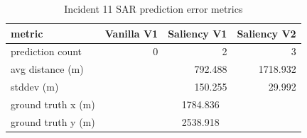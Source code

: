 \begin{table}[ht]
\centering
\caption{Incident 11 SAR prediction error metrics}
\label{tab:sar-incident-11}
\begin{tabular}{lrrr}
\hline
metric & Vanilla V1 & Saliency V1 & Saliency V2 \\
\hline
prediction count & 0 & 2 & 3 \\
avg distance (m) &  & 792.488 & 1718.932 \\
stddev (m) &  & 150.255 & 29.992 \\
ground truth x (m) & \multicolumn{3}{c}{1784.836} \\
ground truth y (m) & \multicolumn{3}{c}{2538.918} \\
\hline
\end{tabular}
\end{table}
